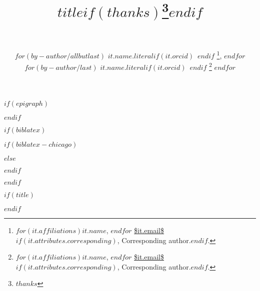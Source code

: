 
$if(epigraph)$
\usepackage{epigraph}
\renewcommand{\epigraphsize}{\footnotesize}
\setlength{\epigraphrule}{0em}
\setlength{\beforeepigraphskip}{-2em}
\setlength{\afterepigraphskip}{1em}
$endif$

$if(biblatex)$
\usepackage{csquotes}
$if(biblatex-chicago)$
\usepackage[$if(biblio-style)$$biblio-style$,$endif$$for(biblatexoptions)$$biblatexoptions$$sep$,$endfor$]{biblatex-chicago}
$else$
\usepackage[$if(biblio-style)$style=$biblio-style$,$endif$$for(biblatexoptions)$$biblatexoptions$$sep$,$endfor$]{biblatex}
$endif$

\setlength\bibitemsep{4pt}  %
\renewcommand*{\bibfont}{\normalsize} 
\setlength\bibhang{2em}  %



$endif$

\usepackage{orcidlink}  %

$if(title)$
\title{\MakeUppercase{$title$}$if(thanks)$\thanks{$thanks$}$endif$\\~}
$endif$


\author{
   \parbox{\linewidth}{\centering
  $for(by-author/allbutlast)$
 $it.name.literal$$if(it.orcid)$~$endif$
 \thanks{$for(it.affiliations)$$it.name$, $endfor$%
{\footnotesize \url{$it.email$}}$if(it.attributes.corresponding)$, Corresponding author.$endif$.},
 $endfor$
 $for(by-author/last)$
 $it.name.literal$$if(it.orcid)$~$endif$
 \thanks{$for(it.affiliations)$$it.name$, $endfor$%
{\footnotesize \url{$it.email$}}$if(it.attributes.corresponding)$, Corresponding author.$endif$.}
 $endfor$
 }
 }

